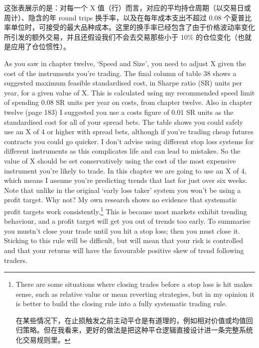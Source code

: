 \begin{chineseblock}这张表展示的是：对每一个 X 值（行）而言，对应的平均持仓周期（以交易日或周计）、隐含的年 round trips 换手率，以及在每年成本支出不超过 0.08 个夏普比率单位时，可接受的最大品种成本。这里的换手率已经包含了由于价格波动率变化所引发的额外交易，并且还假设我们不会去交易那些小于 10\% 的仓位变化（也就是应用了仓位惯性）。\end{chineseblock}

\bipairgap

\begin{englishblock} As you saw in chapter twelve, ‘Speed and Size', you need to adjust X given the cost of the instruments you're trading. The final column of table 38 shows a suggested maximum feasible standardised cost, in Sharpe ratio (SR) units per year, for a given value of X. This is calculated using my recommended speed limit of spending 0.08 SR units per year on costs, from chapter twelve. Also in chapter twelve (page 183) I suggested you use a costs figure of 0.01 SR units as the standardised cost for all of your spread bets. The table shows you could safely use an X of 4 or higher with spread bets, although if you're trading cheap futures contracts you could go quicker. I don't advise using different stop loss systems for different instruments as this complicates life and can lead to mistakes. So the value of X should be set conservatively using the cost of the most expensive instrument you're likely to trade. In this chapter we are going to use an X of 4, which means I assume you're predicting trends that last for just over six weeks. Note that unlike in the original ‘early loss taker' system you won't be using a profit target. Why not? My own research shows no evidence that systematic profit targets work consistently.\footnote{There are some situations where closing trades before a stop loss is hit makes sense, such as relative value or mean reverting strategies, but in my opinion it is better to build the closing rule into a fully systematic trading rule. \par 在某些情况下，在止损触发之前主动平仓是有道理的，例如相对价值或均值回归策略。但在我看来，更好的做法是把这种平仓逻辑直接设计进一条完整系统化交易规则里。} This is because most markets exhibit trending behaviour, and a profit target will get you out of trends too early. To summarise you mustn't close your trade until you hit a stop loss; then you must close it. Sticking to this rule will be difficult, but will mean that your risk is controlled and that your returns will have the favourable positive skew of trend following traders. \end{englishblock}

